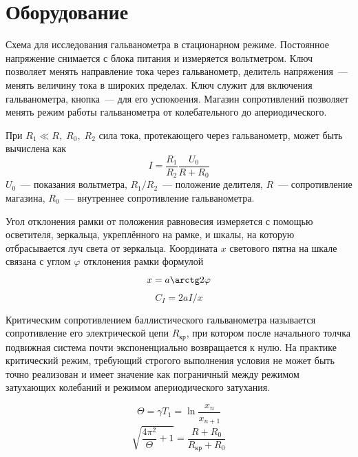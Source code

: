 \section{Оборудование}
Схема для исследования гальванометра в стационарном режиме. Постоянное напряжение снимается с блока
питания и измеряется вольтметром. Ключ позволяет менять направление тока через гальванометр,
делитель напряжения~--- менять величину тока в широких пределах. Ключ служит для включения
гальванометра, кнопка~--- для его успокоения. Магазин сопротивлений позволяет менять режим работы гальванометра от колебательного до апериодического.

При $R_{1} \ll R,\;R_{0},\;R_{2}$ сила тока, протекающего через гальванометр, может быть вычислена как 
\[
    I = \frac{R_{1}}{R_{2}}\frac{U_{0}}{R+R_{0}}
\]
$U_{0}$~--- показания вольтметра, $R_{1}/R_{2}$~--- положение делителя, $R$~--- сопротивление магазина, $R_{0}$~--- внутреннее сопротивление гальванометра.

Угол отклонения рамки от положения равновесия измеряется с помощью осветителя, зеркальца, укреплённого на рамке, и шкалы, на которую отбрасывается луч света от зеркальца. Координата $x$ светового
пятна на шкале связана с углом $\varphi$ отклонения рамки формулой
\[
    x = a\arctg 2\varphi
\]
\[
    C_{I} = 2aI/x
\]

Критическим сопротивлением баллистического гальванометра называется сопротивление его электрической цепи $R_{\text{кр}}$,  при котором после начального толчка подвижная система почти экспоненциально возвращается к нулю. На практике критический режим, требующий строгого выполнения условия не может быть
точно реализован и имеет значение как пограничный между режимом
затухающих колебаний  и режимом апериодического затухания.

\begin{figure}[ht!]
\end{figure}

\[
    \Theta = \gamma T_{1} = \ln\frac{x_{n}}{x_{n+1}}
\]
\[
    \sqrt{\frac{4\pi^{2}}{\Theta}+1} = \frac{R+R_{0}}{R_{\text{кр}}+R_{0}}
\]

